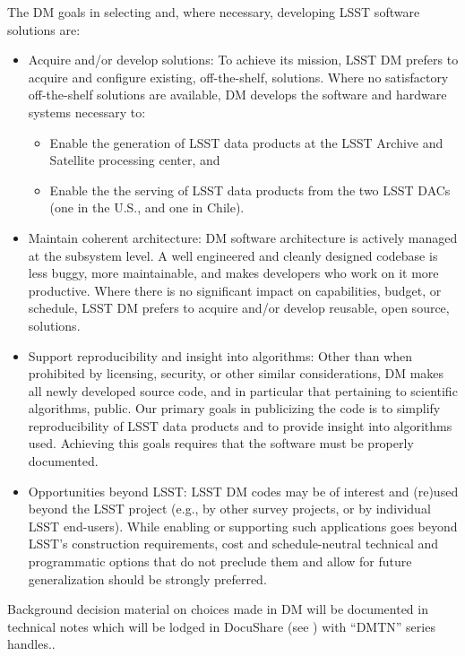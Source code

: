 The DM goals in selecting and, where necessary, developing LSST software solutions are:

\begin{itemize}
	\item Acquire and/or develop solutions: To achieve its mission, LSST DM prefers to acquire and configure existing, off-the-shelf, solutions. Where no satisfactory off-the-shelf solutions are available, DM develops the software and hardware systems necessary to:
\begin{itemize}
	\item Enable the generation of LSST data products at the LSST Archive and Satellite processing center, and
	\item Enable the the serving of LSST data products from the two LSST DACs (one in the U.S., and one in Chile).
\end{itemize}
	\item Maintain coherent architecture: DM software architecture is actively managed at the subsystem level. A well engineered and cleanly designed codebase is less buggy, more maintainable, and makes developers who work on it more productive. Where there is no significant impact on capabilities, budget, or schedule, LSST DM prefers to acquire and/or develop reusable, open source, solutions.
	\item Support reproducibility and insight into algorithms: Other than when prohibited by licensing, security, or other similar considerations, DM makes all newly developed source code, and in particular that pertaining to scientific algorithms,  public. Our primary goals in publicizing the code is to simplify reproducibility of LSST data products and to provide insight into algorithms used. Achieving this goals requires that the software must be properly documented.
	\item Opportunities beyond LSST: LSST DM codes may be of interest and (re)used beyond the LSST project (e.g., by other survey projects, or by individual LSST end-users). While enabling or supporting such applications goes beyond LSST’s construction requirements, cost and schedule-neutral technical and programmatic options that do not preclude them and allow for future generalization should be strongly preferred.


\end{itemize}

Background decision material on choices made in DM will be documented in technical notes which will be lodged in DocuShare (see ) with ``DMTN'' series handles..
